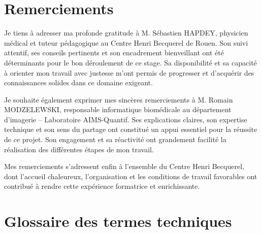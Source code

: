 \documentclass[12pt,a4paper]{report}
\let\oldchapter\chapter
\renewcommand{\chapter}{\clearpage\oldchapter}
\begin{document}


\chapter*{Remerciements}

Je tiens à adresser ma profonde gratitude à M. Sébastien HAPDEY, physicien médical et tuteur pédagogique au Centre Henri Becquerel de Rouen. Son suivi attentif, ses conseils pertinents et son encadrement bienveillant ont été déterminants pour le bon déroulement de ce stage. Sa disponibilité et sa capacité à orienter mon travail avec justesse m'ont permis de progresser et d'acquérir des connaissances solides dans ce domaine exigeant.

Je souhaite également exprimer mes sincères remerciements à M. Romain MODZELEWSKI, responsable informatique biomédicale au département d'imagerie – Laboratoire AIMS-Quantif. Ses explications claires, son expertise technique et son sens du partage ont constitué un appui essentiel pour la réussite de ce projet. Son engagement et sa réactivité ont grandement facilité la réalisation des différentes étapes de mon travail.

Mes remerciements s'adressent enfin à l'ensemble du Centre Henri Becquerel, dont l'accueil chaleureux, l'organisation et les conditions de travail favorables ont contribué à rendre cette expérience formatrice et enrichissante.

\tableofcontents
\newpage

\listoffigures
\newpage

\listoftables
\newpage

\chapter*{Glossaire des termes techniques}
\end{document}
